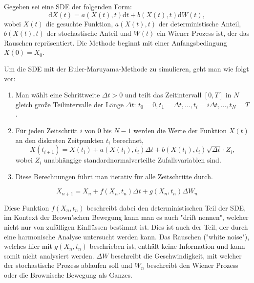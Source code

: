 Gegeben sei eine SDE der folgenden Form:
\begin{equation}
	\mathrm{d}X(t) = a(X(t), t) \mathrm{d}t + b(X(t), t) \mathrm{d}W(t),
\end{equation}
wobei $X(t)$ die gesuchte Funktion, $a(X(t), t)$ der deterministische Anteil, $b(X(t), t)$ der stochastische Anteil und $W(t)$ ein Wiener-Prozess ist, der das Rauschen repräsentiert. Die Methode beginnt mit einer Anfangsbedingung $X(0) = X_0$.

Um die SDE mit der Euler-Maruyama-Methode zu simulieren, geht man wie folgt vor:

\begin{enumerate}
	\item Man wählt eine Schrittweite $\Delta t > 0$ und teilt das Zeitintervall $[0, T]$ in $N$ gleich große Teilintervalle der Länge $\Delta t$: $t_0 = 0, t_1 = \Delta t, \dots, t_i = i\Delta t, \dots, t_N = T$.
	\item Für jeden Zeitschritt $i$ von $0$ bis $N-1$ werden die Werte der Funktion $X(t)$ an den diskreten Zeitpunkten $t_i$ berechnet,
	\begin{equation}
		X(t_{i+1}) = X(t_i) + a(X(t_i), t_i) \Delta t + b(X(t_i), t_i) \sqrt{\Delta t} \cdot Z_i,
	\end{equation}
	wobei $Z_i$ unabhängige standardnormalverteilte Zufallsvariablen sind.
	\item Diese Berechnungen führt man iterativ für alle Zeitschritte durch.
\end{enumerate}

\begin{equation}
	X_{n+1} = X_n + f(X_n,t_n) \Delta t + g(X_n,t_n) \Delta W_n
\end{equation}

Diese Funktion $ f(X_n,t_n) $ beschreibt dabei den deterministischen Teil der SDE, im Kontext der Brown'schen Bewegung kann man es auch "drift nennen", welcher nicht nur von zufälligen Einflüssen bestimmt ist. Dies ist auch der Teil, der durch eine harmonische Analyse untersucht werden kann. Das Rauschen ("white noise"), welches hier mit $ g(X_n,t_n) $ beschrieben ist, enthält keine Information und kann somit nicht analysiert werden. $ \Delta W $ beschreibt die Geschwindigkeit, mit welcher der stochastische Prozess ablaufen soll und $ W_n $  beschreibt den Wiener Prozess oder die Brownische Bewegung als Ganzes.

